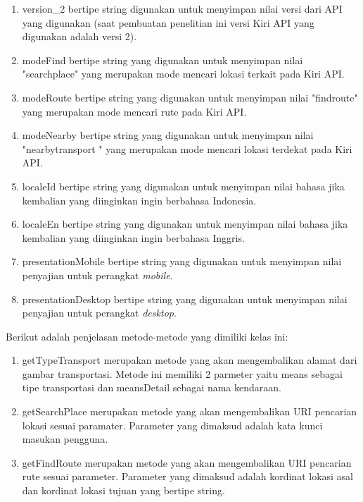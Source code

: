 \begin{enumerate}
	\item version\_2 bertipe string digunakan untuk menyimpan nilai versi dari API yang digunakan (saat pembuatan penelitian ini versi Kiri API yang digunakan adalah versi 2).
	\item modeFind bertipe string yang digunakan untuk menyimpan nilai "searchplace" yang merupakan mode mencari lokasi terkait pada Kiri API.
	\item modeRoute bertipe string yang digunakan untuk menyimpan nilai "findroute" yang merupakan mode mencari rute pada Kiri API.
	\item modeNearby bertipe string yang digunakan untuk menyimpan nilai "nearbytransport	" yang merupakan mode mencari lokasi terdekat pada Kiri API.
	
	\item localeId bertipe string yang digunakan untuk menyimpan nilai bahasa jika kembalian yang diinginkan ingin berbahasa Indonesia.
	\item localeEn bertipe string yang digunakan untuk menyimpan nilai bahasa jika kembalian yang diinginkan ingin berbahasa Inggris.
	\item presentationMobile bertipe string yang digunakan untuk menyimpan nilai penyajian untuk perangkat \textit{mobile}.
	\item presentationDesktop bertipe string yang digunakan untuk menyimpan nilai penyajian untuk perangkat \textit{desktop}.
\end{enumerate}

Berikut adalah penjelasan metode-metode yang dimiliki kelas ini:
\begin{enumerate}
	\item getTypeTransport merupakan metode yang akan mengembalikan alamat dari gambar transportasi. Metode ini memiliki 2 parmeter yaitu means sebagai tipe transportasi dan meansDetail sebagai nama kendaraan.
	\item getSearchPlace merupakan metode yang akan mengembalikan URI pencarian lokasi sesuai paramater. Parameter yang dimaksud adalah kata kunci masukan pengguna.
	\item getFindRoute merupakan metode yang akan mengembalikan URI pencarian rute sesuai parameter. Parameter yang dimaksud adalah kordinat lokasi asal dan kordinat lokasi tujuan yang bertipe string.
\end{enumerate}

